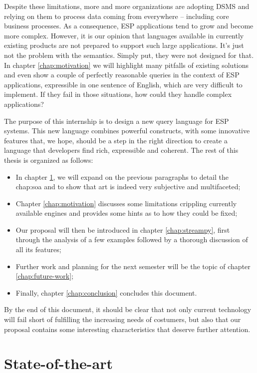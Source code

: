 \documentclass{report}
\begin{document}
Despite these limitations, more and more organizations are adopting
DSMS and relying on them to process data coming from everywhere --
including core business processes. As a consequence, ESP applications
tend to grow and become more complex. However, it is our opinion that
languages available in currently existing products are not prepared to
support such large applications. It's just not the problem with the
semantics. Simply put, they were not designed for that. In chapter
\ref{chap:motivation} we will highlight many pitfalls of existing
solutions and even show a couple of perfectly reasonable queries in
the context of ESP applications, expressible in one sentence of
English, which are very difficult to implement. If they fail in those
situations, how could they handle complex applications?

The purpose of this internship is to design a new query language for
ESP systems. This new language combines powerful constructs, with some
innovative features that, we hope, should be a step in the right
direction to create a language that developers find rich, expressible
and coherent. The rest of this thesis is organized as follows:

\begin{itemize}
\item In chapter \ref{chap:soa}, we will expand on the previous
  paragraphs to detail the chap:soa and to show that art is indeed
  very subjective and multifaceted;
\item Chapter \ref{chap:motivation} discusses some limitations
  crippling currently available engines and provides some hints as to
  how they could be fixed;
\item Our proposal will then be introduced in chapter
  \ref{chap:streampy}, first through the analysis of a few examples
  followed by a thorough discussion of all its features;
\item Further work and planning for the next semester will be the
  topic of chapter \ref{chap:future-work};
\item Finally, chapter \ref{chap:conclusion} concludes this document.
\end{itemize}

By the end of this document, it should be clear that not only current
technology will fail short of fulfilling the increasing needs of
costumers, but also that our proposal contains some interesting
characteristics that deserve further attention.

\chapter{State-of-the-art}
\label{chap:soa}
\end{document}
